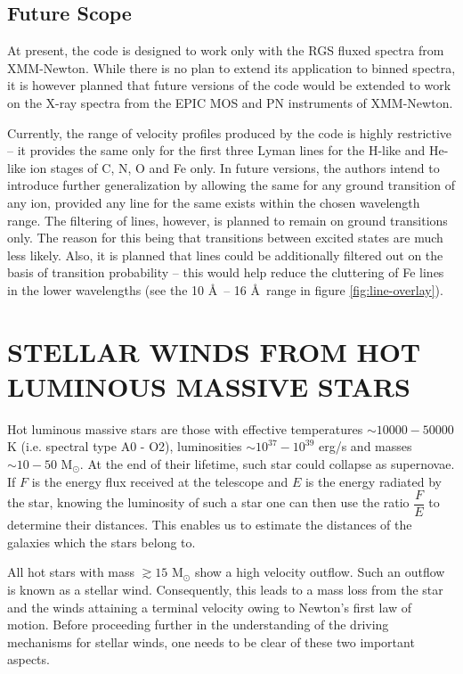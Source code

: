     \subsection{Future Scope} \label{tool:rgs-files:scope}
    	At present, the code is designed to work only with the RGS fluxed spectra from XMM-Newton. While there is no plan to extend its application to binned spectra, it is however planned that future versions of the code would be extended to work on the X-ray spectra from the EPIC MOS and PN instruments of XMM-Newton.
    	
    	Currently, the range of velocity profiles produced by the code is highly restrictive -- it provides the same only for the first three Lyman lines for the H-like and He-like ion stages of C, N, O and Fe only. In future versions, the authors intend to introduce further generalization by allowing the same for any ground transition of any ion, provided any line for the same exists within the chosen wavelength range. The filtering of lines, however, is planned to remain on ground transitions only. The reason for this being that transitions between excited states are much less likely. Also, it is planned that lines could be additionally filtered out on the basis of transition probability -- this would help reduce the cluttering of Fe lines in the lower wavelengths (see the 10 \AA\ -- 16 \AA\ range in figure \ref{fig:line-overlay}).
    
    \section{\MakeUppercase{Stellar Winds from Hot Luminous Massive Stars}} \label{tool:stellar-winds}
        Hot luminous massive stars are those with effective temperatures $\sim 10000-50000$ K (i.e. spectral type A0 - O2), luminosities $\sim 10^{37}-10^{39}$ erg/s and masses $\sim 10-50$ M$_\odot$. At the end of their lifetime, such star could collapse as supernovae. If $F$ is the energy flux received at the telescope and $E$ is the energy radiated by the star, knowing the luminosity of such a star one can then use the ratio $\dfrac{F}{E}$ to determine their distances. This enables us to estimate the distances of the galaxies which the stars belong to.
        
        All hot stars with mass $\gtrsim 15$ M$_\odot$ show a high velocity outflow\cite{kudritzki2000winds}. Such an outflow is known as a stellar wind. Consequently, this leads to a mass loss from the star and the winds attaining a terminal velocity owing to Newton's first law of motion. Before proceeding further in the understanding of the driving mechanisms for stellar winds, one needs to be clear of these two important aspects.
        
